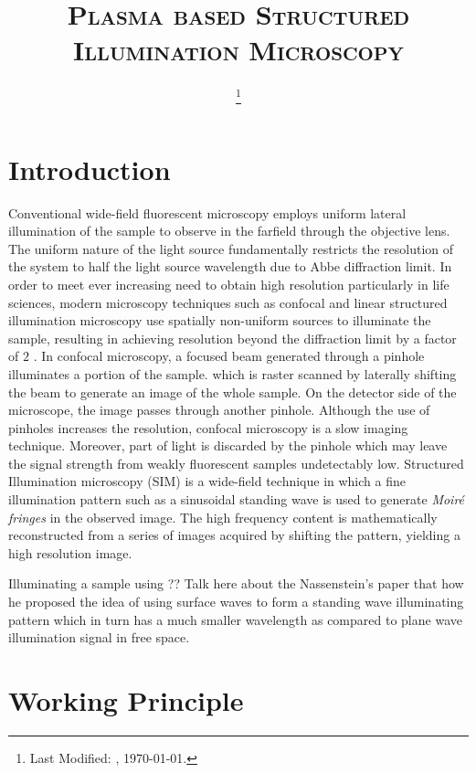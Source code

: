 \documentclass[11pt]{article}
\begin{document}
\title{\textsc{Plasma based Structured Illumination Microscopy}\\}
\date{\footnote{Last Modified: \currenttime, \today.}}
\maketitle

\section{Introduction}


Conventional wide-field fluorescent microscopy employs uniform lateral illumination of the sample to observe in the farfield through the objective lens. The uniform nature of the light source fundamentally restricts the resolution of the system to half the light source wavelength due to Abbe diffraction limit. In order to meet ever increasing need to obtain high resolution particularly in life sciences, modern microscopy techniques such as confocal and linear structured illumination microscopy use spatially non-uniform sources to illuminate the sample, resulting in achieving resolution beyond the diffraction limit by a factor of $2$ \cite{Minsky_1988,Gustafsson_2005}. In confocal microscopy, a focused beam generated through a pinhole illuminates a portion of the sample. which is raster scanned by laterally shifting the beam to generate an image of the whole sample. On the detector side of the microscope, the image passes through another pinhole. Although the use of pinholes increases the resolution, confocal microscopy is a slow imaging technique. Moreover, part of light is discarded by the pinhole which may leave the signal strength from weakly fluorescent samples undetectably low. Structured Illumination microscopy (SIM) is a wide-field technique in which a fine illumination pattern such as a sinusoidal standing wave is used to generate \emph{Moiré fringes} in the observed image. The high frequency content is mathematically reconstructed from a series of images acquired by shifting the pattern, yielding a high resolution image.

Illuminating a sample using
?? Talk here about the Nassenstein's paper that how he proposed the idea of using surface waves to form a standing wave illuminating pattern which in turn has a much smaller wavelength as compared to plane wave illumination signal in free space.

\section{Working Principle}
\end{document}
